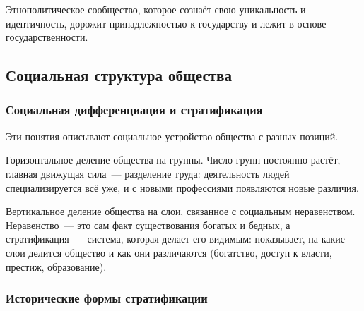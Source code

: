 \documentclass[12pt]{article}
\begin{document}
	\begin{definition}
		Этнополитическое сообщество, которое сознаёт свою уникальность и идентичность, дорожит принадлежностью к государству и лежит в основе государственности.
	\end{definition}

	\subsection{Социальная структура общества}

	\subsubsection{Социальная дифференциация и стратификация}

	Эти понятия описывают социальное устройство общества с разных позиций.

	\begin{definition}
		Горизонтальное деление общества на группы. Число групп постоянно растёт, главная движущая сила~--- разделение труда: деятельность людей специализируется всё уже, и с новыми профессиями появляются новые различия.
	\end{definition}

	\begin{definition}
		Вертикальное деление общества на слои, связанное с социальным неравенством. Неравенство~--- это сам факт существования богатых и бедных, а стратификация~--- система, которая делает его видимым: показывает, на какие слои делится общество и как они различаются (богатство, доступ к власти, престиж, образование).
	\end{definition}

	\subsubsection{Исторические формы стратификации}
\end{document}
